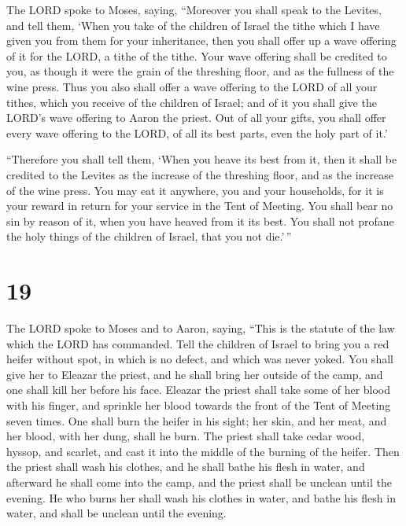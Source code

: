  The LORD spoke to Moses, saying, 
``Moreover you shall speak to the Levites, and tell them, `When you take
of the children of Israel the tithe which I have given you from them for
your inheritance, then you shall offer up a wave offering of it for the
LORD, a tithe of the tithe.  Your wave offering shall be
credited to you, as though it were the grain of the threshing floor, and
as the fullness of the wine press.  Thus you also shall
offer a wave offering to the LORD of all your tithes, which you receive
of the children of Israel; and of it you shall give the LORD's wave
offering to Aaron the priest.  Out of all your gifts, you
shall offer every wave offering to the LORD, of all its best parts, even
the holy part of it.'

 ``Therefore you shall tell them, `When you heave its
best from it, then it shall be credited to the Levites as the increase
of the threshing floor, and as the increase of the wine press.
 You may eat it anywhere, you and your households, for it
is your reward in return for your service in the Tent of Meeting.
 You shall bear no sin by reason of it, when you have
heaved from it its best. You shall not profane the holy things of the
children of Israel, that you not die.'\,''

\hypertarget{section-18}{%
\section{19}\label{section-18}}

 The LORD spoke to Moses and to Aaron, saying,
 ``This is the statute of the law which the LORD has
commanded. Tell the children of Israel to bring you a red heifer without
spot, in which is no defect, and which was never yoked. 
You shall give her to Eleazar the priest, and he shall bring her outside
of the camp, and one shall kill her before his face. 
Eleazar the priest shall take some of her blood with his finger, and
sprinkle her blood towards the front of the Tent of Meeting seven times.
 One shall burn the heifer in his sight; her skin, and her
meat, and her blood, with her dung, shall he burn.  The
priest shall take cedar wood, hyssop, and scarlet, and cast it into the
middle of the burning of the heifer.  Then the priest
shall wash his clothes, and he shall bathe his flesh in water, and
afterward he shall come into the camp, and the priest shall be unclean
until the evening.  He who burns her shall wash his
clothes in water, and bathe his flesh in water, and shall be unclean
until the evening.

